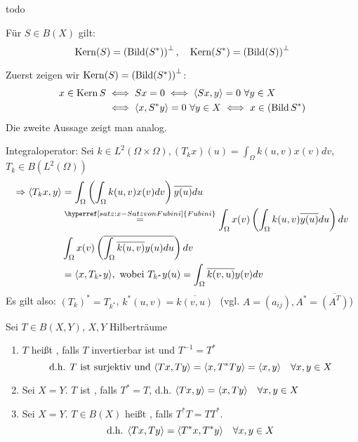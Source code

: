 \begin{beweis}
	todo %
\end{beweis}


\begin{kor}
	Für $S \in B(X)$ gilt:
	\[ \mathop{\rm Kern}\nolimits(S) = \left( \mathop{\rm Bild}\nolimits(S^{*}) \right)^{\bot}, \quad \mathop{\rm Kern}\nolimits(S^{*}) = \left( \mathop{\rm Bild}\nolimits(S) \right)^{\bot} \]	
\end{kor}

\begin{beweis}
	Zuerst zeigen wir $\mathop{\rm Kern}\nolimits(S) = \left( \mathop{\rm Bild}\nolimits(S^{*}) \right)^{\bot}$:
	\begin{align*}
		x \in \mathop{\rm Kern}\nolimits S & \iff S x = 0 \iff \langle S x , y \rangle = 0  ~ \forall y \in X \\
			& \iff \langle x , S^{*} y \rangle = 0 ~\forall y \in X \iff x \in \left( \mathop{\rm Bild}\nolimits S^{*} \right)
	\end{align*}
	Die zweite Aussage zeigt man analog.
\end{beweis}


\begin{beispiel}
	Integraloperator: Sei $k \in L^{2}( \Omega \times \Omega), (T_{k}x)(u) = \int_{\Omega} k(u, v) x(v) dv$, $T_{k} \in B(L^{2}(\Omega))$
	\begin{align*}
		\Rightarrow \< T_{k} x , y \> & = \int_{\Omega} \left( \int_{\Omega} k(u, v) x(v) dv \right) \overline{y(u)} du \\
			& \overset{\hyperref[satz:x-SatzvonFubini]{Fubini}}{=} \int_{\Omega} x(v) \left( \int_{\Omega} k(u, v)\overline{y(u)} du \right) dv \\
			& \int_{\Omega} x(v) \left( \overline{ \int_{\Omega} \overline{k(u, v)} y(u) du} \right) dv \\
			& = \< x , T_{k^{*}} y \>, \text{ wobei } T_{k^{*}} y(u) = \int_{\Omega} \overline{k(v, u)} y(v) dv
	\end{align*}
	Es gilt also: $\left( T_{k} \right)^{*} = T_{k^{*}}$, $k^{*}(u, v) = \overline{k(v, u)}$ $ $ (vgl. $A = (a_{ij}), A^{*} = \overline{(A^{T})}$)
\end{beispiel}


\begin{definition}
	Sei $T \in B(X, Y)$, $X, Y$ Hilberträume
	\begin{enumerate}[label=\alph*\upshape)]
		\item $T$ hei{\ss}t , falls $T$ invertierbar ist und $T^{-1} = T^{*}$
			\[ \text{d.h. } T \text{ ist surjektiv und } \langle Tx , Ty \rangle = \langle x , T^{*} T y \rangle = \langle x , y \rangle \quad \forall x, y \in X \]
		\item Sei $X = Y$. $T$ ist , falls $T^{*} = T$, d.h. $\langle Tx , y \rangle = \langle x , T y \rangle \quad \forall x, y \in X$
		\item Sei $X = Y$. $T \in B(X)$ hei{\ss}t , falls $T^{*} T = T T^{*}$.
			\[ \text{d.h. } \langle Tx , Ty \rangle = \langle T^{*} x , T^{*} y \rangle \quad \forall x, y \in X \]
	\end{enumerate}
\end{definition}


